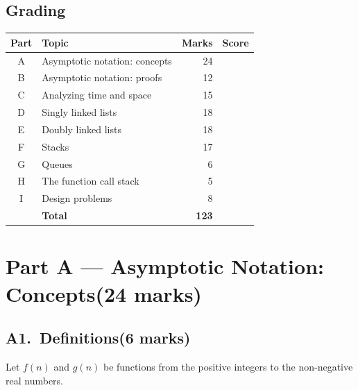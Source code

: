 \documentclass[11pt]{article}
\newcommand{\score}[1]{{\unskip\nobreak\hfil\penalty50
  \hskip2em\hbox{}\nobreak\hfil\mbox{[\hspace{2.5em}/\,#1\,]}%
  \parfillskip=0pt \finalhyphendemerits=0 \par}}
\newcommand{\partheading}[4][12\baselineskip]{\needspace{#1}%
  \section*{Part #2 --- #3\hfill{\normalsize\normalfont(#4 marks)}}}
\newcommand{\question}[4][8\baselineskip]{\needspace{#1}%
  \subsection*{#2.\ #3\hfill{\normalsize\normalfont(#4 marks)}}}
\begin{document}
\subsection*{Grading}
\begin{center}
\renewcommand{\arraystretch}{1.4}
\begin{tabular}{|c|l|r|C{2.8cm}|}
  \hline
  \textbf{Part} & \textbf{Topic} & \textbf{Marks} & \textbf{Score} \\ \hline
  A & Asymptotic notation: concepts & 24 & \\ \hline
  B & Asymptotic notation: proofs   & 12 & \\ \hline
  C & Analyzing time and space      & 15 & \\ \hline
  D & Singly linked lists           & 18 & \\ \hline
  E & Doubly linked lists           & 18 & \\ \hline
  F & Stacks                        & 17 & \\ \hline
  G & Queues                        &  6 & \\ \hline
  H & The function call stack       &  5 & \\ \hline
  I & Design problems               &  8 & \\ \hline
    & \textbf{Total}                & \textbf{123} & \\ \hline
\end{tabular}
\end{center}

\clearpage

\partheading{A}{Asymptotic Notation: Concepts}{24}

\question{A1}{Definitions}{6}
Let $f(n)$ and $g(n)$ be functions from the positive integers to the
non-negative real numbers.
\end{document}
